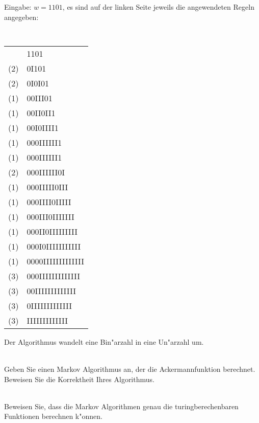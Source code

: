 \documentclass[a4paper]{article}
\begin{document}
Eingabe: $w=1101$, es sind auf der linken Seite jeweils die angewendeten Regeln angegeben:\\
\hspace*{1cm}
{\small\tt
\begin{tabular}{rl}
   &1101\\
(2)&0I101\\
(2)&0I0I01\\
(1)&00III01\\
(1)&00II0II1\\
(1)&00I0IIII1\\
(1)&000IIIIII1\\
(1)&000IIIIII1\\
(2)&000IIIIII0I\\
(1)&000IIIII0III\\
(1)&000IIII0IIIII\\
(1)&000III0IIIIIII\\
(1)&000II0IIIIIIIII\\
(1)&000I0IIIIIIIIIII\\
(1)&0000IIIIIIIIIIIII\\
(3)&000IIIIIIIIIIIII\\
(3)&00IIIIIIIIIIIII\\
(3)&0IIIIIIIIIIIII\\
(3)&IIIIIIIIIIIII\\
\end{tabular}
}

Der Algorithmus wandelt eine Bin"arzahl in eine Un"arzahl um.


\bigskip
{}\\
Geben Sie einen Markov Algorithmus an, der die Ackermannfunktion berechnet. Beweisen Sie die Korrektheit Ihres Algorithmus.

\bigskip
{}\\
Beweisen Sie, dass die Markov Algorithmen genau die turingberechenbaren Funktionen berechnen k"onnen.
\end{document}
